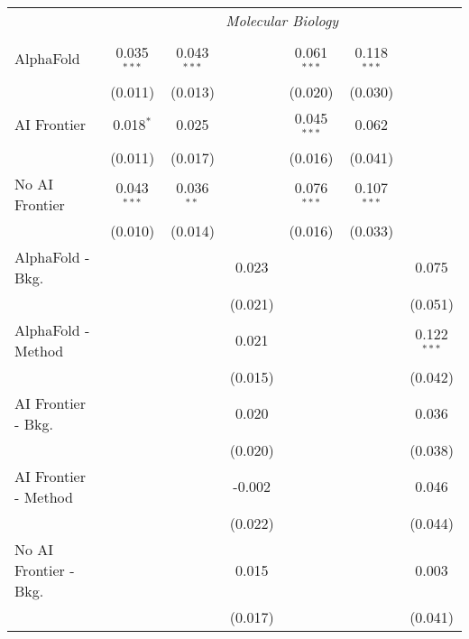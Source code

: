 \begin{tabular}{lcccccc}
 & \multicolumn{6}{c}{\textit{Molecular Biology}} \\ \\
   AlphaFold               & 0.035$^{***}$ & 0.043$^{***}$ &              & 0.061$^{***}$ & 0.118$^{***}$ &   \\   
                           & (0.011)       & (0.013)       &              & (0.020)       & (0.030)       &   \\   
   AI Frontier             & 0.018$^{*}$   & 0.025         &              & 0.045$^{***}$ & 0.062         &   \\   
                           & (0.011)       & (0.017)       &              & (0.016)       & (0.041)       &   \\   
   No AI Frontier          & 0.043$^{***}$ & 0.036$^{**}$  &              & 0.076$^{***}$ & 0.107$^{***}$ &   \\   
                           & (0.010)       & (0.014)       &              & (0.016)       & (0.033)       &   \\   
   AlphaFold - Bkg.        &               &               & 0.023        &               &               & 0.075\\   
                           &               &               & (0.021)      &               &               & (0.051)\\   
   AlphaFold - Method      &               &               & 0.021        &               &               & 0.122$^{***}$\\   
                           &               &               & (0.015)      &               &               & (0.042)\\   
   AI Frontier - Bkg.      &               &               & 0.020        &               &               & 0.036\\   
                           &               &               & (0.020)      &               &               & (0.038)\\   
   AI Frontier - Method    &               &               & -0.002       &               &               & 0.046\\   
                           &               &               & (0.022)      &               &               & (0.044)\\   
   No AI Frontier - Bkg.   &               &               & 0.015        &               &               & 0.003\\   
                           &               &               & (0.017)      &               &               & (0.041)\\   

\end{tabular}
